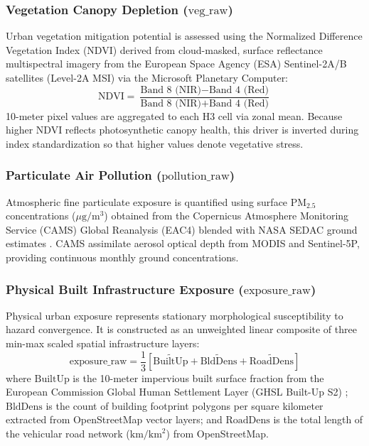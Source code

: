 \subsubsection{Vegetation Canopy Depletion \texorpdfstring{($\text{veg\_raw}$)}{(veg\_raw)}}
Urban vegetation mitigation potential is assessed using the Normalized Difference Vegetation Index (NDVI) derived from cloud-masked, surface reflectance multispectral imagery from the European Space Agency (ESA) Sentinel-2A/B satellites (Level-2A MSI) via the Microsoft Planetary Computer:
\begin{equation}
    \text{NDVI} = \frac{\text{Band 8 (NIR)} - \text{Band 4 (Red)}}{\text{Band 8 (NIR)} + \text{Band 4 (Red)}}
\end{equation}
10-meter pixel values are aggregated to each H3 cell via zonal mean. Because higher NDVI reflects photosynthetic canopy health, this driver is inverted during index standardization so that higher values denote vegetative stress.

\subsubsection{Particulate Air Pollution \texorpdfstring{($\text{pollution\_raw}$)}{(pollution\_raw)}}
Atmospheric fine particulate exposure is quantified using surface $\text{PM}_{2.5}$ concentrations ($\mu\text{g}/\text{m}^3$) obtained from the Copernicus Atmosphere Monitoring Service (CAMS) Global Reanalysis (EAC4) blended with NASA SEDAC ground estimates \citep{inness2019cams, van2016global}. CAMS assimilate aerosol optical depth from MODIS and Sentinel-5P, providing continuous monthly ground concentrations.

\subsubsection{Physical Built Infrastructure Exposure \texorpdfstring{($\text{exposure\_raw}$)}{(exposure\_raw)}}
Physical urban exposure represents stationary morphological susceptibility to hazard convergence. It is constructed as an unweighted linear composite of three min-max scaled spatial infrastructure layers:
\begin{equation}
    \text{exposure\_raw} = \frac{1}{3}\left[\widetilde{\text{BuiltUp}} + \widetilde{\text{BldDens}} + \widetilde{\text{RoadDens}}\right]
\end{equation}
where $\text{BuiltUp}$ is the 10-meter impervious built surface fraction from the European Commission Global Human Settlement Layer (GHSL Built-Up S2) \citep{pesaresi2016ghsl}; $\text{BldDens}$ is the count of building footprint polygons per square kilometer extracted from OpenStreetMap vector layers; and $\text{RoadDens}$ is the total length of the vehicular road network ($\text{km}/\text{km}^2$) from OpenStreetMap.

